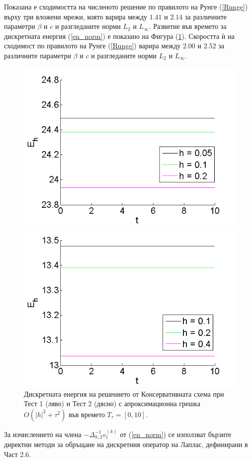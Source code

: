 \documentclass[a5paper]{article}
\newcommand{\rf}[1]{(\ref{#1})}
\theoremstyle{remark}
\begin{document}
\begin{large}
Показана е сходимостта на численото решение по правилото на Рунге \rf{Runge} върху три вложени мрежи, която варира между $1.41$ и $2.14$ за различните параметри $\beta$ и $c$ и разгледаните норми $L_2$ и $L_\infty$. Развитие във времето за дискретната енергия \rf{en_norm} е показано на Фигура \rf{EnOnly}. Скоростта ѝ на сходимост по правилото на Рунге \rf{Runge} варира между $2.00$ и $2.52$ за различните параметри $\beta$ и $c$ и разгледаните норми $L_2$ и $L_\infty$.
\begin{figure}[ht]
	\begin{minipage}[b]{0.49\linewidth}
		\includegraphics[width=\linewidth]{../amitans/figures/Energy_EnergySave_bt3_c045_x3O.png}	
	\end{minipage}
	\begin{minipage}[b]{0.49\linewidth}
		 \includegraphics[width=\linewidth]{../amitans/figures/Energy_EnergySave_bt1_c090_x3O.png}
	\end{minipage}
\caption{Дискретната енергия на решението от Консервативната схема при Тест 1 (ляво) и Тест 2 (дясно) с апроксимационна грешка $O(|h|^2 + \tau^2)$ във времето $T_{\tau} = [0, 10]$.}
\label{EnOnly}
\end{figure}
За изчислението на члена $-\Delta_{h,2}^{-1}v_{t}^{(k)}$ от \rf{en_norm} се използват бързите директни методи за обръщане на дискретния оператор на Лаплас, дефинирани в Част 2.6.\\


\end{large}
\end{document}

